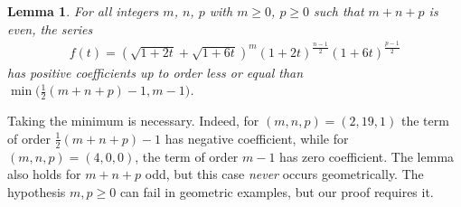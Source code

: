 \documentclass[10pt,a4paper]{amsart}
\numberwithin{equation}{section}
\newtheorem{Lemma}[Theorem]{Lemma}
\begin{document}
\begin{Lemma}\label{cl}
For all integers $m$, $n$, $p$ with $m\geq 0$, $p\geq 0$ such that $m+n+p$ is even, the series
\begin{gather*}
f(t)=\left(\sqrt{1+2t}+\sqrt{1+6t}\right)^m {(1+2t)}^{\frac{n-1}{2}} (1+6t)^{\frac{p-1}{2}}
\end{gather*}
has positive coefficients up to order less or equal than $\min\big(\frac{1}{2}(m+n+p)-1, m-1\big)$.
\end{Lemma}
Taking the minimum is necessary. Indeed, for $(m, n, p)=(2, 19, 1)$ the term of order $\frac{1}{2}(m+n+p)-1$ has negative coefficient, while for $(m, n, p)=(4, 0, 0)$, the term of order $m-1$ has zero coefficient. The lemma also holds for $m+n+p$ odd, but this case {\it never} occurs geometrically. The hypothesis $m, p\geq 0$ can fail in geometric examples, but our proof requires it.
\end{document}
